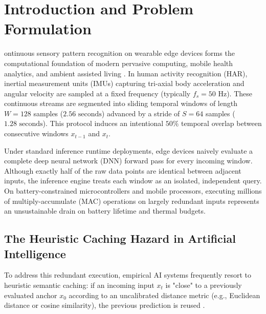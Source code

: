 \documentclass[journal,onecolumn,10pt]{IEEEtran}
\renewcommand{\IEEEPARstart}[2]{\noindent{\bfseries\Large #1}#2}
\theoremstyle{remark}
\begin{document}
\tableofcontents
\newpage

\section{Introduction and Problem Formulation}
\IEEEPARstart{C}{ontinuous} sensory pattern recognition on wearable edge devices forms the computational foundation of modern pervasive computing, mobile health analytics, and ambient assisted living \cite{reyesortiz2015hapt, reyes2016transition}. In human activity recognition (HAR), inertial measurement units (IMUs) capturing tri-axial body acceleration and angular velocity are sampled at a fixed frequency (typically $f_s = 50\text{ Hz}$). These continuous streams are segmented into sliding temporal windows of length $W = 128$ samples ($2.56\text{ seconds}$) advanced by a stride of $S = 64$ samples ($1.28\text{ seconds}$). This protocol induces an intentional $50\%$ temporal overlap between consecutive windows $x_{t-1}$ and $x_t$.

Under standard inference runtime deployments, edge devices naively evaluate a complete deep neural network (DNN) forward pass for every incoming window. Although exactly half of the raw data points are identical between adjacent inputs, the inference engine treats each window as an isolated, independent query. On battery-constrained microcontrollers and mobile processors, executing millions of multiply-accumulate (MAC) operations on largely redundant inputs represents an unsustainable drain on battery lifetime and thermal budgets.

\subsection{The Heuristic Caching Hazard in Artificial Intelligence}
To address this redundant execution, empirical AI systems frequently resort to heuristic semantic caching: if an incoming input $x_t$ is "close" to a previously evaluated anchor $x_0$ according to an uncalibrated distance metric (e.g., Euclidean distance or cosine similarity), the previous prediction is reused \cite{kang2017noscope, parger2022deltacnn}. 
\end{document}
